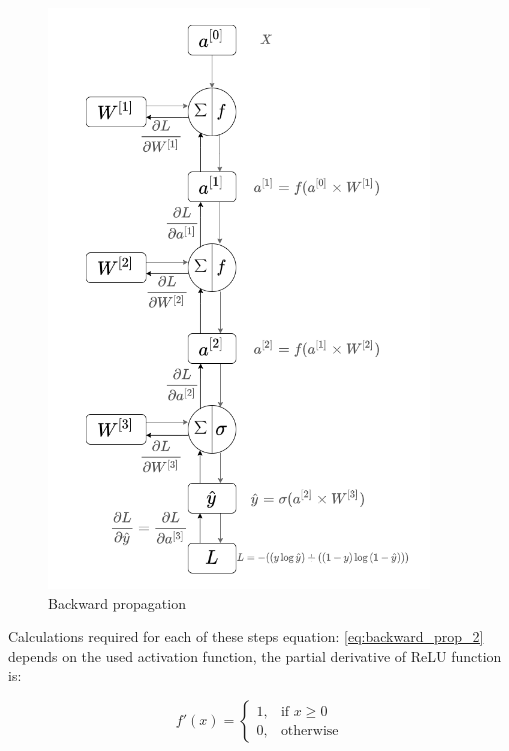 \begin{figure}
    \centering
    \includegraphics[width=0.9\textwidth]{images/backward_prop_1.png}
    \caption{Backward propagation}
    \label{fig:backward_prop_1}
\end{figure}



Calculations required for each of these steps equation: \ref{eq:backward_prop_2} depends on the used activation function, the partial derivative of ReLU function is:

\begin{equation} \label{eq:backward_prop_3}
    f'(x)= 
\begin{cases}
    1,& \text{if } x\geq 0\\
    0,& \text{otherwise}
\end{cases}
\end{equation}

